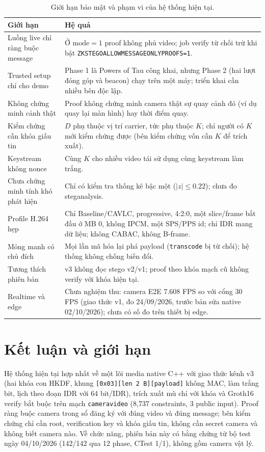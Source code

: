 \documentclass[11pt,a4paper]{article}
\renewcommand{\_}{\origunderscore\allowbreak}
\begin{document}
\begin{table}[H]\centering\small
\caption{Giới hạn bảo mật và phạm vi của hệ thống hiện tại.}
\begin{tabularx}{\textwidth}{p{4.0cm}X}\toprule
Giới hạn & Hệ quả\\\midrule
Luồng live chỉ ràng buộc message & Ở $\mathrm{mode}=1$ proof không phủ video; job verify từ chối trừ khi bật \texttt{ZK\_STEGO\_ALLOW\_MESSAGE\_ONLY\_PROOFS=1}.\\
Trusted setup chỉ cho demo & Phase 1 là Powers of Tau công khai, nhưng Phase 2 (hai lượt đóng góp và beacon) chạy trên một máy; triển khai cần nhiều bên độc lập.\\
Không chứng minh cảnh thật & Proof không chứng minh camera thật sự quay cảnh đó (ví dụ quay lại màn hình) hay thời điểm quay.\\
Kiểm chứng cần khóa giấu tin & $D$ phụ thuộc vị trí carrier, tức phụ thuộc $K$; chỉ người có $K$ mới kiểm chứng được (bên kiểm chứng vốn cần $K$ để trích xuất).\\
Keystream không nonce & Cùng $K$ cho nhiều video tái sử dụng cùng keystream làm trắng.\\
Chưa chứng minh tính khó phát hiện & Chỉ có kiểm tra thống kê bậc một ($|z|\le0.22$); chưa đo steganalysis.\\
Profile H.264 hẹp & Chỉ Baseline/CAVLC, progressive, 4:2:0, một slice/frame bắt đầu ở MB 0, không I\_PCM, một SPS/PPS id; chỉ IDR mang dữ liệu; không CABAC, không B-frame.\\
Mỏng manh có chủ đích & Mọi lần mã hóa lại phá payload (\texttt{transcode} bị từ chối); hệ thống không chống biến đổi.\\
Tương thích phiên bản & v3 không đọc stego v2/v1; proof theo khóa mạch cũ không verify với khóa hiện tại.\\
Realtime và edge & Chưa nghiệm thu: camera E2E 7.608 FPS so với cổng 30 FPS (giao thức v1, đo 24/09/2026, trước bản sửa native 02/10/2026); chưa có số đo trên thiết bị edge.\\
\bottomrule\end{tabularx}
\end{table}

\section{Kết luận và giới hạn}
Hệ thống hiện tại hợp nhất về một lõi media native C++ với giao thức kênh v3 (hai khóa con HKDF, khung \texttt{[0x03][len 2 B][payload]} không MAC, làm trắng bit, lịch theo đoạn IDR với 64 bit/IDR), trích xuất mù chỉ với khóa và Groth16 verify bắt buộc trên mạch \texttt{camera\_video} (8,737 constraints, 3 public input). Proof ràng buộc camera trong sổ đăng ký với đúng video và đúng message; bên kiểm chứng chỉ cần root, verification key và khóa giấu tin, không cần secret camera và không biết camera nào. Về chức năng, phiên bản này có bằng chứng từ bộ test ngày 04/10/2026 (142/142 qua 12 phase, CTest 1/1), không gồm camera vật lý.
\end{document}
